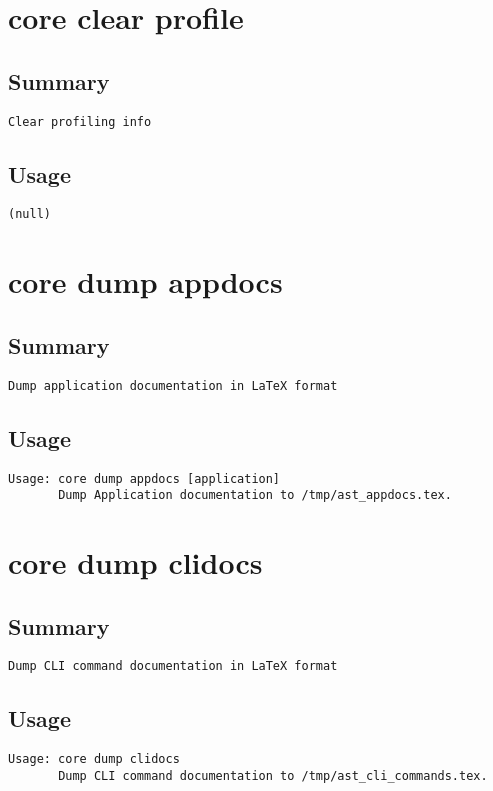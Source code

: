 \section{core clear profile}
\subsection{Summary}
\begin{verbatim}
Clear profiling info
\end{verbatim}
\subsection{Usage}
\begin{verbatim}
(null)
\end{verbatim}


\section{core dump appdocs}
\subsection{Summary}
\begin{verbatim}
Dump application documentation in LaTeX format
\end{verbatim}
\subsection{Usage}
\begin{verbatim}
Usage: core dump appdocs [application]
       Dump Application documentation to /tmp/ast_appdocs.tex.

\end{verbatim}


\section{core dump clidocs}
\subsection{Summary}
\begin{verbatim}
Dump CLI command documentation in LaTeX format
\end{verbatim}
\subsection{Usage}
\begin{verbatim}
Usage: core dump clidocs
       Dump CLI command documentation to /tmp/ast_cli_commands.tex.

\end{verbatim}


